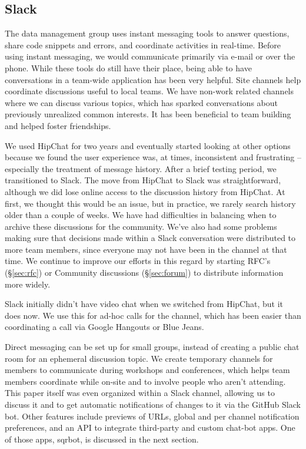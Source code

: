 \subsection{Slack}
\label{sec:slack}

The data management group uses instant messaging tools  to answer questions,
share code snippets and errors, and coordinate activities in real-time.
Before using instant messaging, we would communicate primarily via e-mail or
over the phone. While these tools do still have their place, being able to have
conversations in a team-wide application has been very helpful.
Site channels help coordinate discussions
useful to local teams.  We have non-work related channels where we can
discuss various topics, which has sparked conversations about previously
unrealized common interests. It has been beneficial to team building and
helped foster friendships.


We used HipChat for two years and eventually started looking at other options
because we found the user experience was, at times, inconsistent and
frustrating -- especially the treatment of message history.
After a brief testing period, we transitioned to Slack.
The move from HipChat to Slack was straightforward,
although we did lose online access to the discussion history from HipChat.  At first, we
thought this would be an issue, but in practice, we rarely search history older
than a couple of weeks.  We have had difficulties in balancing when to
archive these discussions for the community.  We've also had some problems
making sure that decisions made within a Slack conversation were
distributed to more team members, since everyone may not have been in the
channel at that time.  We continue to improve our efforts in this regard by
starting RFC's (\S\ref{sec:rfc}) or Community discussions (\S\ref{sec:forum}) to distribute information more widely.

Slack initially didn't have video chat when we switched from HipChat, but
it does now.  We use this for ad-hoc calls for the channel, which has been
easier than coordinating a call via Google Hangouts or Blue Jeans.

Direct messaging can be set up for small groups,
instead of creating a public chat room for an ephemeral discussion topic.
We create temporary channels for members to communicate during workshops and
conferences, which helps team members coordinate while on-site and to involve
people who aren't attending.  This paper itself was even organized
within a Slack channel, allowing us to discuss it and to get automatic
notifications of changes to it via the GitHub Slack bot.
Other features include previews of URLs, global and per channel notification preferences, and an
API to integrate third-party and custom chat-bot apps. One of those apps,
sqrbot, is discussed in the next section.


